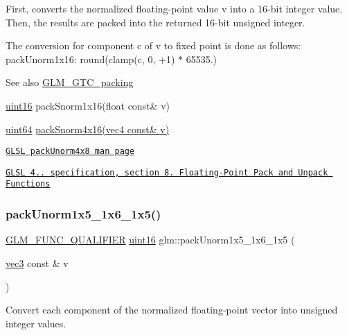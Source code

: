 First, converts the normalized floating-\/point value v into a 16-\/bit integer value. Then, the results are packed into the returned 16-\/bit unsigned integer.

The conversion for component c of v to fixed point is done as follows\+: pack\+Unorm1x16\+: round(clamp(c, 0, +1) $\ast$ 65535.)

\begin{DoxySeeAlso}{See also}
\hyperlink{group__gtc__packing}{G\+L\+M\+\_\+\+G\+T\+C\+\_\+packing} 

\hyperlink{group__gtc__type__precision_gad8c2939e1fdd8e5828b31d95c52255d5}{uint16} pack\+Snorm1x16(float const\& v) 

\hyperlink{group__gtc__type__precision_gae3632bf9b37da66233d78930dd06378a}{uint64} \hyperlink{group__gtc__packing_ga9b237d7c66b7a71964e6d1f4dc06539f}{pack\+Snorm4x16(vec4 const\& v)} 

\href{http://www.opengl.org/sdk/docs/manglsl/xhtml/packUnorm4x8.xml}{\tt G\+L\+SL pack\+Unorm4x8 man page} 

\href{http://www.opengl.org/registry/doc/GLSLangSpec.4.20.8.pdf}{\tt G\+L\+SL 4.. specification, section 8. Floating-\/\+Point Pack and Unpack Functions} 
\end{DoxySeeAlso}
\mbox{\label{group__gtc__packing_ga0fcb493167d540aca105d11df5c55503}} 
\subsubsection{\texorpdfstring{pack\+Unorm1x5\+\_\+1x6\+\_\+1x5()}{packUnorm1x5\_1x6\_1x5()}}
{\footnotesize\ttfamily \hyperlink{setup_8hpp_a33fdea6f91c5f834105f7415e2a64407}{G\+L\+M\+\_\+\+F\+U\+N\+C\+\_\+\+Q\+U\+A\+L\+I\+F\+I\+ER} \hyperlink{group__gtc__type__precision_gad8c2939e1fdd8e5828b31d95c52255d5}{uint16} glm\+::pack\+Unorm1x5\+\_\+1x6\+\_\+1x5 (\begin{DoxyParamCaption}\item[{\hyperlink{group__core__types_ga1c47e8b3386109bc992b6c48e91b0be7}{vec3} const \&}]{v }\end{DoxyParamCaption})}

Convert each component of the normalized floating-\/point vector into unsigned integer values.


